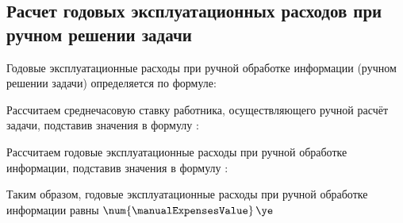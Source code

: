 \subsection{Расчет годовых эксплуатационных расходов при ручном решении задачи}
\label{sec:economics:manualexpenses}

Годовые эксплуатационные расходы при ручной обработке информации (ручном решении задачи) определяется по формуле:
\manualExpensesEquation

Рассчитаем среднечасовую ставку работника, осуществляющего ручной расчёт задачи, подставив значения в формулу :
\monkerHourRateFormulaApplied

Рассчитаем годовые эксплуатационные расходы при ручной обработке информации, подставив значения в формулу :
\manualExpensesFormulaApplied

Таким образом, годовые эксплуатационные расходы при ручной обработке информации равны \(\num{\manualExpensesValue} \, \ye\)